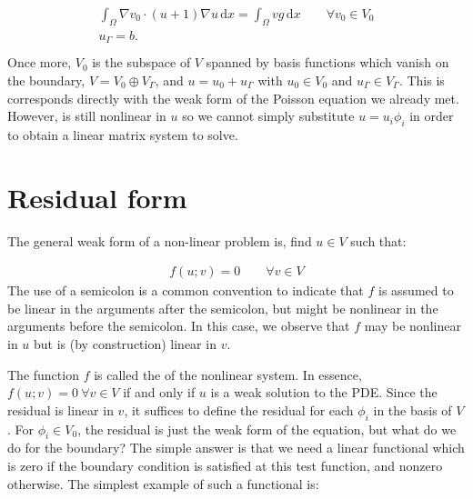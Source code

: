 \documentclass{book}
\begin{document}
\label{\detokenize{8_nonlinear_problems:equation-weakdiffusion}}\begin{align}\label{equation:8_nonlinear_problems:weakdiffusion}\!\begin{aligned}
\int_\Omega \nabla v_0 \cdot (u + 1) \nabla u \, \mathrm{d} x = \int_\Omega vg \, \mathrm{d} x \qquad \forall v_0 \in V_0\\
u_\Gamma = b.\\
\end{aligned}\end{align}
Once more, \(V_0\) is the subspace of \(V\) spanned by basis functions which
vanish on the boundary, \(V = V_0 \oplus V_\Gamma\), and \(u = u_0 +
u_\Gamma\) with \(u_0\in V_0\) and \(u_\Gamma\in V_\Gamma\). This is
corresponds directly with the weak form of the Poisson equation we
already met. However, {\hyperref[\detokenize{8_nonlinear_problems:equation-weakdiffusion}]{}} is still nonlinear in \(u\) so
we cannot simply substitute \(u = u_i\phi_i\) in order to obtain a
linear matrix system to solve.


\section{Residual form}
\label{\detokenize{8_nonlinear_problems:residual-form}}
The general weak form of a non-linear problem is, find \(u\in V\) such that:

\label{\detokenize{8_nonlinear_problems:equation-8_nonlinear_problems:0}}\begin{equation}\label{equation:8_nonlinear_problems:8_nonlinear_problems:0}
\begin{split}f(u; v) = 0 \qquad \forall v \in V\end{split}
\end{equation}
The use of a semicolon is a common convention to indicate that \(f\) is
assumed to be linear in the arguments after the semicolon, but might
be nonlinear in the arguments before the semicolon. In this case,
we observe that \(f\) may be nonlinear in \(u\) but is (by
construction) linear in \(v\).

The function \(f\) is called the  of the nonlinear system. In
essence, \(f(u; v) = 0 \ \forall v\in V\) if and only if \(u\) is a weak
solution to the PDE. Since the residual is linear in \(v\), it suffices
to define the residual for each \(\phi_i\) in the basis of \(V\). For
\(\phi_i\in V_0\), the residual is just the weak form of the equation,
but what do we do for the boundary? The simple answer is that we need
a linear functional which is zero if the boundary condition is
satisfied at this test function, and nonzero otherwise. The simplest
example of such a functional is:
\end{document}
